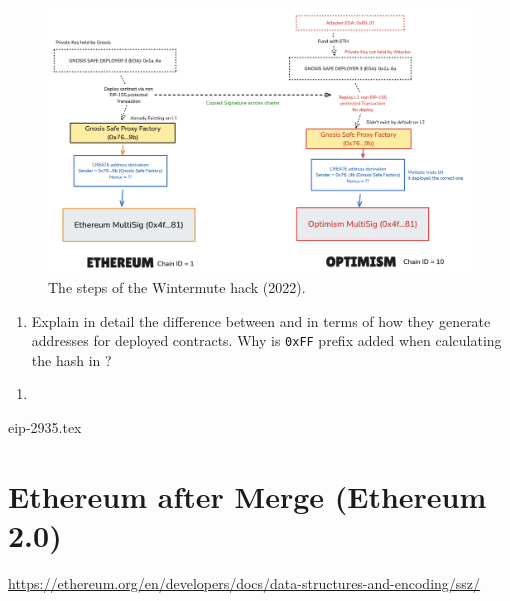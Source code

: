 \begin{figure}[h]
    \centering
    \includegraphics[width=1.0\textwidth]{ethereum/assets/wintermute-hack.png}
    \caption{The steps of the Wintermute hack (2022).}
    \label{fig:wintermute-hack}
\end{figure}

\begin{Exercise}[title={Ethereum Deployments}]
    \begin{enumerate}
        \item Explain in detail the difference between  and  in terms of how they generate addresses for deployed contracts. Why is \texttt{0xFF} prefix added when calculating the hash in ?
    \end{enumerate}
\end{Exercise}
\begin{Answer}
    \begin{enumerate}
        \item {}
    \end{enumerate}
\end{Answer}

{eip-2935.tex}
\section{Ethereum after Merge (Ethereum 2.0)}

\href{https://ethereum.org/en/developers/docs/data-structures-and-encoding/ssz/}{https://ethereum.org/en/developers/docs/data-structures-and-encoding/ssz/}


